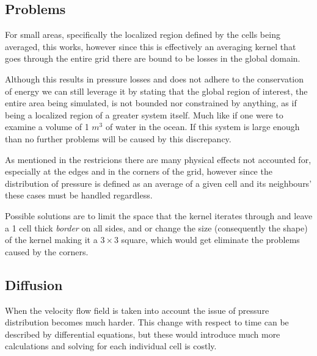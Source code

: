 \documentclass[12pt, titlepage]{article}
\begin{document}
\subsection{Problems}
For small areas, specifically the localized region defined by the cells being averaged, this works, however since this is effectively an averaging kernel that goes through the entire grid there are bound to be losses in the global domain. 

\bigskip

Although this results in pressure losses and does not adhere to the conservation of energy we can still leverage it by stating that the global region of interest, the entire area being simulated, is not bounded nor constrained by anything, as if being a localized region of a greater system itself. Much like if one were to examine a volume of 1 $m^3$ of water in the ocean. If this system is large enough than no further problems will be caused by this discrepancy.

\bigskip

As mentioned in the restricions there are many physical effects not accounted for, especially at the edges and in the corners of the grid, however since the distribution of pressure is defined as an average of a given cell and its neighbours' these cases must be handled regardless.

\bigskip

Possible solutions are to limit the space that the kernel iterates through and leave a 1 cell thick \textit{border} on all sides, and or change the size (consequently the shape) of the kernel making it a $3\times3$ square, which would get eliminate the problems caused by the corners.

\subsection{Diffusion}

When the velocity flow field is taken into account the issue of pressure distribution becomes much harder. This change with respect to time can be described by differential equations, but these would introduce much more calculations and solving for each individual cell is costly.
\end{document}
